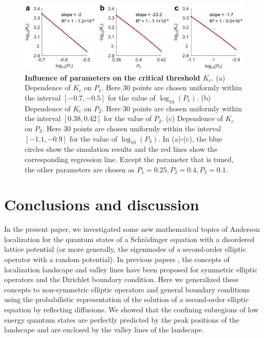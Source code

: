 \documentclass[a4paper,11pt]{article}
\begin{document}
\begin{figure}
\centering
\includegraphics[width=\linewidth]{Fig6}
\caption{\textbf{Influence of parameters on the critical threshold $K_c$}. (a) Dependence of $K_c$ on $P_1$. Here 30 points are chosen uniformly within the interval $[-0.7,-0.5]$ for the value of $\log_{10}(P_1)$. (b) Dependence of $K_c$ on $P_2$. Here 30 points are chosen uniformly within the interval $[0.38,0.42]$ for the value of $P_2$. (c) Dependence of $K_c$ on $P_3$. Here 30 points are chosen uniformly within the interval $[-1.1,-0.9]$ for the value of $\log_{10}(P_3)$. In (a)-(c), the blue circles show the simulation results and the red lines show the corresponding regression line. Except the parameter that is tuned, the other parameters are chosen as $P_1 = 0.25, P_2 = 0.4, P_3 = 0.1$.}
\label{fig6}
\end{figure}


\section{Conclusions and discussion}\label{conclusion}
In the present paper, we investigated some new mathematical topics of Anderson localization for the quantum states of a Schr\"{o}dinger equation with a disordered lattice potential (or more generally, the eigenmodes of a second-order elliptic operator with a random potential). In previous papers \cite{filoche2012universal}, the concepts of localization landscape and valley lines have been proposed  for symmetric elliptic operators and the Dirichlet boundary condition. Here we generalized these concepts to non-symmetric elliptic operators and general boundary conditions using the probabilistic representation of the solution of a second-order elliptic equation by reflecting diffusions. We showed that the confining subregions of low energy quantum states are perfectly predicted by the peak positions of the landscape and are enclosed by the valley lines of the landscape.
\end{document}
